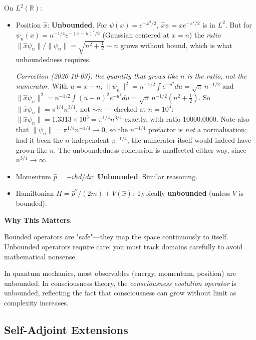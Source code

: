 \begin{example}\label{ex:position-momentum-bounded}
On $L^2(\mathbb{R})$:
\begin{itemize}
\item Position $\hat{x}$: \textbf{Unbounded}. For $\psi(x) = e^{-x^2/2}$,
$\hat{x}\psi = x e^{-x^2/2}$ is in $L^2$. But for
$\psi_n(x) = n^{-1/4} e^{-(x-n)^2/2}$ (Gaussian centered at $x=n$) the
\emph{ratio} $\|\hat{x}\psi_n\|/\|\psi_n\| = \sqrt{n^2 + \tfrac12} \sim n$ grows
without bound, which is what unboundedness requires.

\emph{Correction (2026-10-03): the quantity that grows like $n$ is the ratio, not
the numerator.} With $u = x-n$,
$\|\psi_n\|^2 = n^{-1/2}\!\int e^{-u^2}du = \sqrt\pi\,n^{-1/2}$ and
$\|\hat x\psi_n\|^2 = n^{-1/2}\!\int (u+n)^2e^{-u^2}du = \sqrt\pi\,n^{-1/2}(n^2+\tfrac12)$.
So $\|\hat x\psi_n\| = \pi^{1/4}n^{3/4}$, not $\sim n$ --- checked at
$n = 10^4$: $\|\hat x\psi_n\| = 1.3313\times10^3 = \pi^{1/4}n^{3/4}$ exactly,
with ratio $10000.0000$. Note also that $\|\psi_n\| = \pi^{1/4}n^{-1/4} \to 0$,
so the $n^{-1/4}$ prefactor is \emph{not} a normalisation; had it been the
$n$-independent $\pi^{-1/4}$, the numerator itself would indeed have grown like
$n$. The unboundedness conclusion is unaffected either way, since
$n^{3/4} \to \infty$.

\item Momentum $\hat{p} = -i\hbar d/dx$: \textbf{Unbounded}. Similar reasoning.

\item Hamiltonian $H = \hat{p}^2/(2m) + V(\hat{x})$: Typically \textbf{unbounded} (unless $V$ is bounded).
\end{itemize}
\end{example}

\begin{level1}
\textbf{Why This Matters}:

Bounded operators are "safe"---they map the space continuously to itself. Unbounded operators require care: you must track domains carefully to avoid mathematical nonsense.

In quantum mechanics, most observables (energy, momentum, position) are unbounded. In consciousness theory, the \textit{consciousness evolution operator} is unbounded, reflecting the fact that consciousness can grow without limit as complexity increases.
\end{level1}

\subsection{Self-Adjoint Extensions}

